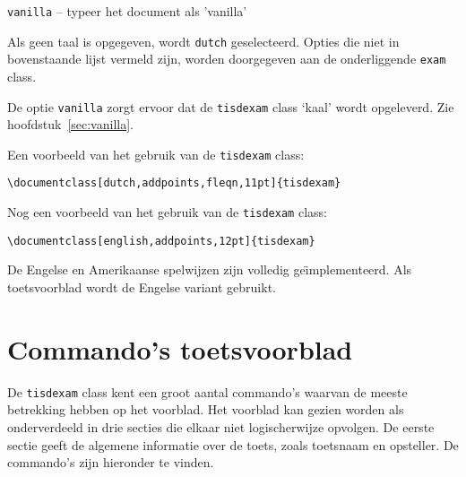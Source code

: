 \documentclass[12pt,dutch,addpoints,fleqn]{tisdexam}
\newcommand\DocClass[1]{\texttt{#1}}
\newcommand\Option[1]{\texttt{#1}}
\begin{document}
\Option{vanilla} -- typeer het document als 'vanilla'


Als geen taal is opgegeven, wordt \Option{dutch} geselecteerd.
Opties die niet in bovenstaande lijst vermeld zijn, worden doorgegeven aan
de onderliggende \DocClass{exam} class.

De optie \Option{vanilla} zorgt ervoor dat de \DocClass{tisdexam} class `kaal'
wordt opgeleverd. Zie hoofdstuk~\ref{sec:vanilla}.

Een voorbeeld van het gebruik van de \DocClass{tisdexam} class:

\verb|\documentclass[dutch,addpoints,fleqn,11pt]{tisdexam}|

Nog een voorbeeld van het gebruik van de \DocClass{tisdexam} class:

\verb|\documentclass[english,addpoints,12pt]{tisdexam}|

De Engelse en Amerikaanse spelwijzen zijn volledig
ge\"{\i}mplementeerd. Als toetsvoorblad wordt de Engelse variant gebruikt.


\section{Commando's toetsvoorblad}
\label{sec:commands}

De \DocClass{tisdexam} class kent een groot aantal commando's waarvan de meeste
betrekking hebben op het voorblad.  Het voorblad kan gezien worden als onderverdeeld
in drie secties die elkaar niet logischerwijze opvolgen. De eerste sectie geeft de
algemene informatie over de toets, zoals
toetsnaam en opsteller. De commando's zijn hieronder te vinden.
\end{document}
